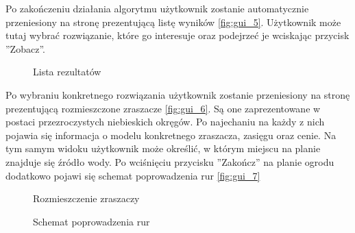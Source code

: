 \documentclass[twoside]{iisthesis}
\begin{document}
Po zakończeniu działania algorytmu użytkownik zostanie automatycznie przeniesiony na stronę prezentującą listę wyników \eqref{fig:gui_5}. Użytkownik może tutaj wybrać rozwiązanie, które go interesuje oraz podejrzeć je wciskając przycisk ''Zobacz''.
\begin{figure}[!htb]
	\centering
	\caption{Lista rezultatów}
	\label{fig:gui_5}
\end{figure}

Po wybraniu konkretnego rozwiązania użytkownik zostanie przeniesiony na stronę prezentującą rozmieszczone zraszacze \eqref{fig:gui_6}. Są one zaprezentowane w postaci przezroczystych niebieskich okręgów. Po najechaniu na każdy z nich pojawia się informacja o modelu konkretnego zraszacza, zasięgu oraz cenie. Na tym samym widoku użytkownik może określić, w którym miejscu na planie znajduje się źródło wody. Po wciśnięciu przycisku ''Zakończ'' na planie ogrodu dodatkowo pojawi się schemat poprowadzenia rur \eqref{fig:gui_7}
\begin{figure}[!htb]
	\centering
	\caption{Rozmieszczenie zraszaczy}
	\label{fig:gui_6}
\end{figure}
\begin{figure}[!htb]
	\centering
	\caption{Schemat poprowadzenia rur}
	\label{fig:gui_7}
\end{figure}
\end{document}
